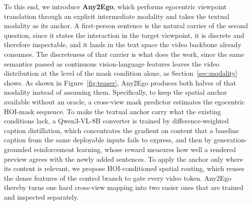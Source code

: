 \documentclass{article}
\begin{document}
To this end, we introduce \textbf{Any2Ego}, which performs egocentric viewpoint
translation through an explicit intermediate modality and takes the textual
modality as its anchor. A first-person sentence is the natural carrier of the
second question, since it states the interaction in the target viewpoint, it is
discrete and therefore inspectable, and it lands in the text space the video
backbone already consumes. The discreteness of that carrier is what does the work, since the same semantics
passed as continuous vision-language features leaves the video distribution at
the level of the mask condition alone, as Section~\ref{sec:modality} shows. As shown in Figure~\ref{fig:teaser}, Any2Ego
produces both halves of that modality instead of assuming them. Specifically, to
keep the spatial anchor available without an oracle, a cross-view mask predictor
estimates the egocentric HOI-mask sequence. To make the textual anchor carry what
the existing conditions lack, a Qwen3-VL-8B converter is trained by
difference-weighted caption distillation, which concentrates the gradient on
content that a baseline caption from the same deployable inputs fails to express,
and then by generation-grounded reinforcement learning, whose reward measures how
well a rendered preview agrees with the newly added sentences. To apply the anchor only where its content is
relevant, we propose HOI-conditioned spatial routing, which reuses the dense
features of the control branch to gate every video token. Any2Ego thereby turns
one hard cross-view mapping into two easier ones that are trained and inspected
separately.
\end{document}
